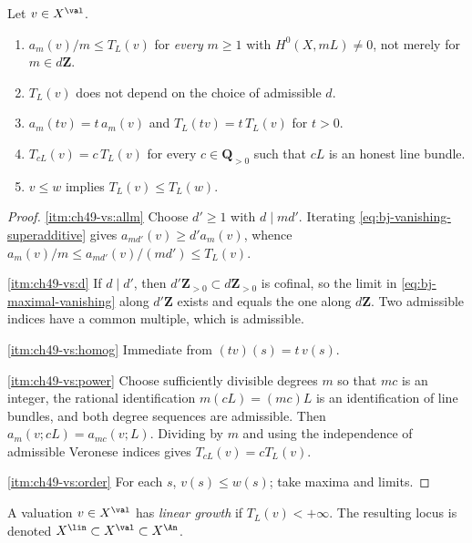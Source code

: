 \begin{lemma}
\label{lem:ch49-vanishing-elementary}
Let $v\in X^{\val}$.
\begin{enumerate}
\item\label{itm:ch49-vs:allm}
      $a_m(v)/m\le T_L(v)$ for \emph{every} $m\ge1$ with
      $H^0(X,mL)\ne0$, not merely for $m\in d\mathbf Z$.
\item\label{itm:ch49-vs:d}
      $T_L(v)$ does not depend on the choice of admissible $d$.
\item\label{itm:ch49-vs:homog}
      $a_m(tv)=t\,a_m(v)$ and $T_L(tv)=t\,T_L(v)$ for $t>0$.
\item\label{itm:ch49-vs:power}
      $T_{cL}(v)=c\,T_L(v)$ for every $c\in\mathbf Q_{>0}$ such that
      $cL$ is an honest line bundle.
\item\label{itm:ch49-vs:order}
      $v\le w$ implies $T_L(v)\le T_L(w)$.
\end{enumerate}
\end{lemma}

\begin{proof}
\cref{itm:ch49-vs:allm}  Choose $d'\ge1$ with $d\mid md'$.  Iterating
\eqref{eq:bj-vanishing-superadditive} gives
$a_{md'}(v)\ge d'a_m(v)$, whence
$a_m(v)/m\le a_{md'}(v)/(md')\le T_L(v)$.

\cref{itm:ch49-vs:d}  If $d\mid d'$, then $d'\mathbf Z_{>0}\subset
d\mathbf Z_{>0}$ is cofinal, so the limit in
\eqref{eq:bj-maximal-vanishing} along $d'\mathbf Z$ exists and equals the
one along $d\mathbf Z$.  Two admissible indices have a common multiple,
which is admissible.

\cref{itm:ch49-vs:homog}  Immediate from $(tv)(s)=t\,v(s)$.

\cref{itm:ch49-vs:power}  Choose sufficiently divisible degrees $m$
so that $mc$ is an integer, the rational identification
$m(cL)=(mc)L$ is an identification of line bundles, and both degree
sequences are admissible.  Then $a_m(v;cL)=a_{mc}(v;L)$.
Dividing by $m$ and using the independence of admissible Veronese
indices gives $T_{cL}(v)=cT_L(v)$.

\cref{itm:ch49-vs:order}  For each $s$, $v(s)\le w(s)$; take maxima and
limits.
\end{proof}

\begin{definition}
\label{def:bj-linear-growth}
A valuation $v\in X^{\val}$ has \emph{linear growth} if
$T_L(v)<+\infty$.  The resulting locus is denoted
$X^{\lin}\subset X^{\val}\subset X^{\An}$.
\end{definition}

